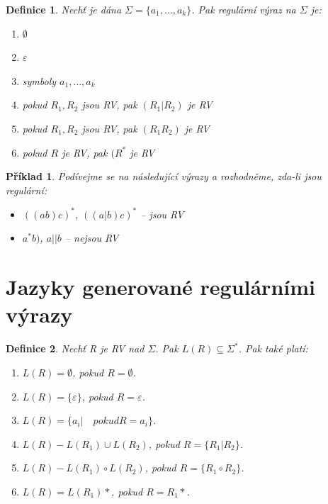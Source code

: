 \documentclass[10pt, a4paper, titlepage]{article}
\theoremstyle{note}
\newtheorem{definice}{\textbf{Definice}}
\newtheorem{priklad}{\textbf{Příklad}}
\begin{document}
\begin{definice}
Nechť je dána $\Sigma = \lbrace a_{1}, \ldots, a_{k} \rbrace$. Pak regulární výraz na $\Sigma$ je:
\begin{enumerate}
\item
$\emptyset$

\item
$\varepsilon$

\item
symboly $a_{1}, \ldots, a_{k}$

\item
pokud $R_{1}, R_{2}$ jsou RV, pak $(R_{1}|R_{2})$ je RV

\item
pokud $R_{1}, R_{2}$ jsou RV, pak $(R_{1}R_{2})$ je RV

\item
pokud $R$ je RV, pak $(R^{*}$ je RV
\end{enumerate}
\end{definice}

\begin{priklad}
Podívejme se na následující výrazy a rozhodněme, zda-li jsou regulární:

\begin{itemize}
\item
$((ab)c)^{*}$, $((a|b)c)^{*}$ -- jsou RV

\item
$a^{*}b)$, $a||b$ -- nejsou RV
\end{itemize}
\end{priklad}

\section{Jazyky generované regulárními výrazy}

\begin{definice}
Nechť \emph{R} je RV nad $\Sigma$. Pak $L(R) \subseteq \Sigma^{*}$. Pak také platí:

\begin{enumerate}
\item\label{jazyky-1}
$L(R) = \emptyset$, pokud $R = \emptyset$.

\item
$L(R) = \lbrace \varepsilon \rbrace$, pokud $R = \varepsilon$.

\item\label{jazyky-3}
$L(R) = \lbrace a_{i} | \quad pokud R=a_{i} \rbrace$.

\item\label{jazyky-4}
$L(R) - L(R_{1}) \cup L(R_{2})$, pokud $R=\lbrace R_{1} | R_{2} \rbrace$. 

\item\label{jazyky-5}
$L(R) - L(R_{1}) \circ L(R_{2})$, pokud $R=\lbrace R_{1}\circ R_{2} \rbrace$.

\item\label{jazyky-6}
$L(R) = L(R_{1})* $, pokud $R = R_{1}*$.
\end{enumerate}
\end{definice}
\end{document}

